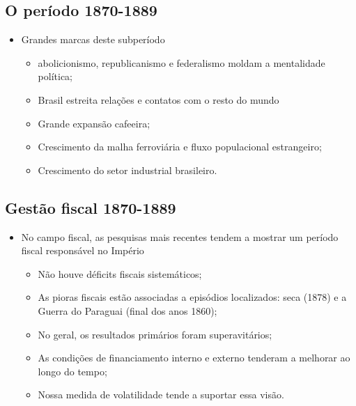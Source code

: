 \documentclass[a4paper,12pt]{article}[abntex2]
\begin{document}
\subsection{\textbf{O período 1870-1889}}
\begin{itemize}
    \item Grandes marcas deste subperíodo
    \begin{itemize}
        \item abolicionismo, republicanismo e federalismo moldam a mentalidade política;
    \end{itemize}
    \begin{itemize}
        \item Brasil estreita relações e contatos com o resto do mundo
    \end{itemize}
    \begin{itemize}
        \item Grande expansão cafeeira;
    \end{itemize}
    \begin{itemize}
        \item Crescimento da malha ferroviária e fluxo populacional estrangeiro;
    \end{itemize}
    \begin{itemize}
        \item  Crescimento do setor industrial brasileiro.
    \end{itemize}
\end{itemize}
\subsection{\textbf{Gestão fiscal 1870-1889}}
\begin{itemize}
    \item No campo fiscal, as pesquisas mais recentes tendem a mostrar um período fiscal responsável no Império
    \begin{itemize}
        \item Não houve déficits fiscais sistemáticos;
    \end{itemize}
    \begin{itemize}
        \item As pioras fiscais estão associadas a episódios localizados: seca (1878) e a Guerra do Paraguai (final dos anos 1860);
    \end{itemize}
    \begin{itemize}
        \item  No geral, os resultados primários foram superavitários;
    \end{itemize}
    \begin{itemize}
        \item As condições de financiamento interno e externo tenderam a melhorar ao longo do tempo;
    \end{itemize}
    \begin{itemize}
        \item Nossa medida de volatilidade tende a suportar essa visão.
    \end{itemize}
\end{itemize}
\end{document}
